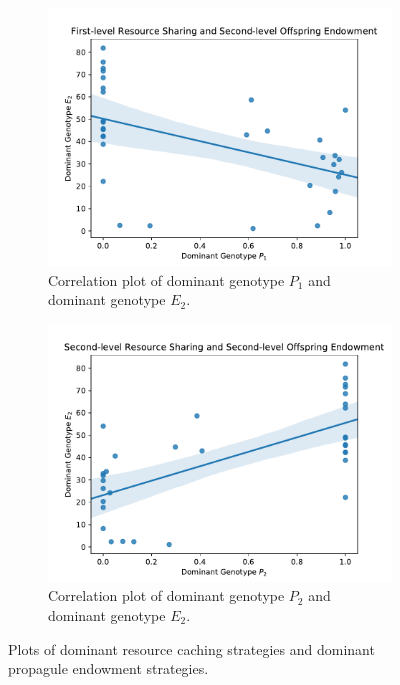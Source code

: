 \begin{figure}[t]
\begin{center}

\begin{subfigure}[b]{\columnwidth}
  \includegraphics[width=\columnwidth]{img/champion_res_pool1_vs_champion_endowment2}
  \caption{
  Correlation plot of dominant genotype $P_1$ and dominant genotype $E_2$.
  }
  \label{fig:champion_res_pool1_vs_champion_endowment2}
\end{subfigure}

\begin{subfigure}[b]{\columnwidth}
  \includegraphics[width=\columnwidth]{img/champion_res_pool2_vs_champion_endowment2}
  \caption{
  Correlation plot of dominant genotype $P_2$ and dominant genotype $E_2$.
  }
  \label{fig:champion_res_pool2_vs_champion_endowment2}
\end{subfigure}

\caption{
Plots of dominant resource caching strategies and dominant propagule endowment strategies.
}
\label{fig:endowment}
\end{center}
\end{figure}
